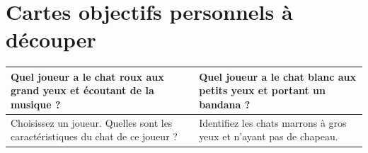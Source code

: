 \documentclass[a4paper, 12pt]{article}
\begin{document}
\section*{Cartes objectifs personnels à découper}


\begin{center}

	\begin{tabular}{|>{\centering\arraybackslash}p{7cm}|>{\centering\arraybackslash}p{7cm}|}
	\hline \vspace{2mm}
	\Large{Quel joueur a le chat roux aux grand yeux et écoutant de la musique ?} \vspace{2mm}& \vspace{2mm} \Large{Quel joueur a le chat blanc aux petits yeux et portant un bandana ?} \vspace{2mm} \\
\hline \vspace{2mm}
	\Large{Choisissez un joueur. Quelles sont les caractéristiques du chat de ce joueur ?} \vspace{2mm}& \vspace{2mm} \Large{Identifiez les chats marrons à gros yeux et n'ayant pas de chapeau.} \vspace{2mm} \\
	\hline
	\end{tabular}

\end{center}
\end{document}
